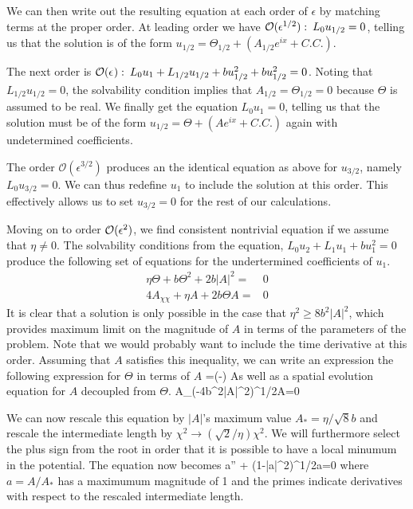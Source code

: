 \documentclass[../main/WavelengthCompetition.tex]{subfiles}
\begin{document}
We can then write out the resulting equation at each order of $\epsilon$ by matching terms at the proper order.
At leading order we have $\mathcal{O}(\epsilon^{1/2}): \: L_0 u_{1/2} =0$, telling us that the solution is of the form $u_{1/2} =\Theta_{1/2} + (A_{1/2} e^{ix} +C.C.)$.

The next order is $\mathcal{O}(\epsilon^{}): \:  L_0 u_{1}+L_{1/2} u_{1/2}  +b u_{1/2}^2+bu_{1/2}^2=0$.  Noting that $L_{1/2} u_{1/2} =0$, the solvability condition implies that $A_{1/2}=\Theta_{1/2}=0$ because $\Theta$ is assumed to be real.  We finally get the equation $L_0 u_1=0$, telling us that the solution must be of the form $u_{1/2} =\Theta + (A e^{ix} +C.C.)$ again with undetermined coefficients.

The order $\mathcal{O}(\epsilon^{3/2})$ produces an the identical equation as above for $u_{3/2}$, namely $L_0 u_{3/2} =0$.  We can thus redefine $u_1$ to include the solution at this order.  This effectively allows us to set $u_{3/2}=0$ for the rest of our calculations.

Moving on to order $\mathcal{O}(\epsilon^{2})$, we find consistent nontrivial equation if we assume that $\eta\neq0$.  The solvability conditions from the equation, $L_0 u_2 +L_1 u_1 +b u_1^2=0$ produce the following set of equations for the undertermined coefficients of $u_1$.
\begin{subequations}
\begin{align}
\eta \Theta+b\Theta^2+2b| A|^2 =&0\\
4 A_{\chi\chi}+\eta A +2 b \Theta A =&0
\end{align}
\end{subequations}
It is clear that a solution is only possible in the case that $\eta^2\geq 8 b^2 |A|^2$, which provides maximum limit on the magnitude of $A$ in terms of the parameters of the problem.  Note that we would probably want to include the time derivative at this order.  Assuming that $A$ satisfies this inequality, we can write an expression the following expression for $\Theta$ in terms of $A$
\beqn
\Theta=\left(-\eta\pm{}\right)
\eeqn
As well as a spatial evolution equation for $A$ decoupled from $\Theta$.
\beqn
A_{\chi\chi}\pm \left(-4b^2|A|^2\right)^{1/2}A=0
\eeqn

We can now rescale this equation by $|A|$'s maximum value $A_*=\eta/\sqrt{8}b$ and rescale the intermediate length by $\chi^2 \rightarrow(\sqrt{2}/\eta) \chi^2$.  We will furthermore select the plus sign from the root in order that it is possible to have a local minumum in the potential.  The equation now becomes
\beqn
a'' + \left(1-|a|^2\right)^{1/2}a=0
\eeqn
where $a=A/A_*$ has a maximumum magnitude of 1 and the primes indicate derivatives with respect to the rescaled intermediate length.
\end{document}
